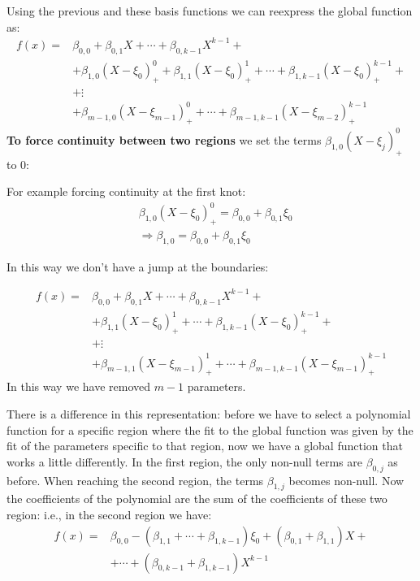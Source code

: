 \documentclass[12pt, letterpaper]{article}
\theoremstyle{definition}
\begin{document}
Using the previous and these basis functions we can reexpress the global function as:
\begin{equation}
\begin{aligned}
f(x) =& \beta_{0,0} + \beta_{0,1}X +\cdots+\beta_{0,k-1}  X^{k-1} + \\
&+\beta_{1,0}(X -\xi_0)_+^0     + \beta_{1,1}(X -\xi_0)_+^1       +\cdots +\beta_{1,k-1} (X -\xi_0)_+^{k-1}+  \\
&+\vdots \\ 
&+\beta_{m-1,0}(X -\xi_{m-1})_+^0 +\cdots +\beta_{m-1,k-1} (X -\xi_{m-2})_+^{k-1}
\end{aligned}
\end{equation}
\textbf{To force continuity between two regions} we set the terms $\beta_{1,0}(X -\xi_j)_+^0$ to $0$:

For example forcing continuity at the first knot:
\begin{equation}
\begin{aligned}
&\beta_{1,0}(X -\xi_0)_+^0 = \beta_{0,0} + \beta_{0,1} \xi_0\\
&\Rightarrow \beta_{1,0} = \beta_{0,0} + \beta_{0,1} \xi_0
\end{aligned}
\end{equation}

 In this way we don't have a jump at the boundaries:

\begin{equation}
\begin{aligned}
f(x) =& \beta_{0,0} + \beta_{0,1}X +\cdots+\beta_{0,k-1}  X^{k-1} + \\
&+ \beta_{1,1}(X -\xi_0)_+^1       +\cdots +\beta_{1,k-1} (X -\xi_0)_+^{k-1}+  \\
&+\vdots \\ 
&+ \beta_{m-1,1}(X -\xi_{m-1})_+^1 +\cdots +\beta_{m-1,k-1} (X -\xi_{m-1})_+^{k-1}
\end{aligned}
\end{equation}
In this way we have removed $m-1$ parameters.

There is a difference in this representation: before we have to select a polynomial function for a specific region where the fit to the global function was given by the fit of the parameters specific to that region, now we have a global function that works a little differently. In the first region, the only non-null terms are $\beta_{0,j}$ as before. When reaching the second region, the terms $\beta_{1,j}$ becomes non-null. Now the coefficients of the polynomial are the sum of the coefficients of these two region: i.e., in the second region we have:
\begin{equation}
\begin{aligned}
f(x) =& \beta_{0,0} -(\beta_{1,1}+\cdots+\beta_{1,k-1})\xi_0+ (\beta_{0,1}+\beta_{1,1})X+\\
&+\cdots+(\beta_{0,k-1}  +\beta_{1,k-1})X^{k-1}
\end{aligned}
\end{equation}
\end{document}
